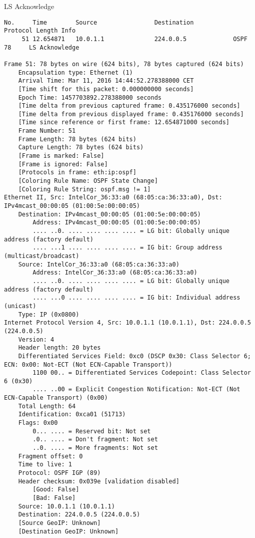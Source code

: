 LS Acknowledge
\begin{lstlisting}
No.     Time        Source                Destination           Protocol Length Info
     51 12.654871   10.0.1.1              224.0.0.5             OSPF     78     LS Acknowledge

Frame 51: 78 bytes on wire (624 bits), 78 bytes captured (624 bits)
    Encapsulation type: Ethernet (1)
    Arrival Time: Mar 11, 2016 14:44:52.278388000 CET
    [Time shift for this packet: 0.000000000 seconds]
    Epoch Time: 1457703892.278388000 seconds
    [Time delta from previous captured frame: 0.435176000 seconds]
    [Time delta from previous displayed frame: 0.435176000 seconds]
    [Time since reference or first frame: 12.654871000 seconds]
    Frame Number: 51
    Frame Length: 78 bytes (624 bits)
    Capture Length: 78 bytes (624 bits)
    [Frame is marked: False]
    [Frame is ignored: False]
    [Protocols in frame: eth:ip:ospf]
    [Coloring Rule Name: OSPF State Change]
    [Coloring Rule String: ospf.msg != 1]
Ethernet II, Src: IntelCor_36:33:a0 (68:05:ca:36:33:a0), Dst: IPv4mcast_00:00:05 (01:00:5e:00:00:05)
    Destination: IPv4mcast_00:00:05 (01:00:5e:00:00:05)
        Address: IPv4mcast_00:00:05 (01:00:5e:00:00:05)
        .... ..0. .... .... .... .... = LG bit: Globally unique address (factory default)
        .... ...1 .... .... .... .... = IG bit: Group address (multicast/broadcast)
    Source: IntelCor_36:33:a0 (68:05:ca:36:33:a0)
        Address: IntelCor_36:33:a0 (68:05:ca:36:33:a0)
        .... ..0. .... .... .... .... = LG bit: Globally unique address (factory default)
        .... ...0 .... .... .... .... = IG bit: Individual address (unicast)
    Type: IP (0x0800)
Internet Protocol Version 4, Src: 10.0.1.1 (10.0.1.1), Dst: 224.0.0.5 (224.0.0.5)
    Version: 4
    Header length: 20 bytes
    Differentiated Services Field: 0xc0 (DSCP 0x30: Class Selector 6; ECN: 0x00: Not-ECT (Not ECN-Capable Transport))
        1100 00.. = Differentiated Services Codepoint: Class Selector 6 (0x30)
        .... ..00 = Explicit Congestion Notification: Not-ECT (Not ECN-Capable Transport) (0x00)
    Total Length: 64
    Identification: 0xca01 (51713)
    Flags: 0x00
        0... .... = Reserved bit: Not set
        .0.. .... = Don't fragment: Not set
        ..0. .... = More fragments: Not set
    Fragment offset: 0
    Time to live: 1
    Protocol: OSPF IGP (89)
    Header checksum: 0x039e [validation disabled]
        [Good: False]
        [Bad: False]
    Source: 10.0.1.1 (10.0.1.1)
    Destination: 224.0.0.5 (224.0.0.5)
    [Source GeoIP: Unknown]
    [Destination GeoIP: Unknown]

\end{lstlisting}
